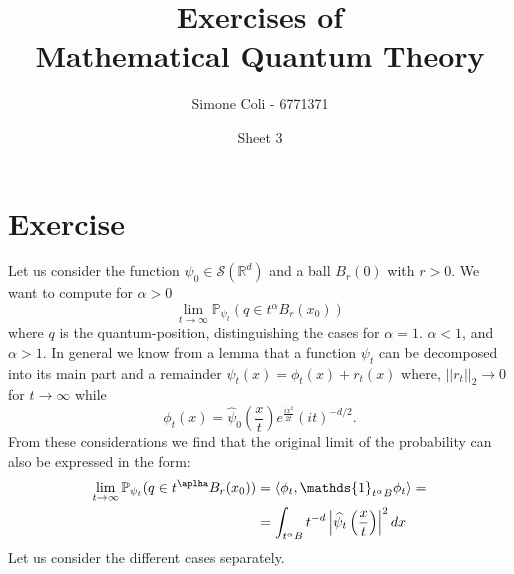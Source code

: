\documentclass{article}
\title{Exercises of \\Mathematical Quantum Theory}
\author{Simone Coli - 6771371}
\date{Sheet 3}
\begin{document}
\maketitle
\section{Exercise}
Let us consider the function $\psi_0 \in \mathcal S (\mathbb R^d)$ and a ball $B_r(0) $ with $r>0$. We want to compute for $\alpha > 0$
\[
    \lim_{t \to \infty} \mathbb P_{\psi_t}(q \in t^{\alpha} B_r(x_0))
\]
where $q$ is the quantum-position, distinguishing the cases for $\alpha = 1$. $\alpha < 1$, and $\alpha > 1$. In general we know from a lemma that a function $\psi_t$ can be decomposed into its main part and a remainder $\psi_t (x) = \phi_t (x) + r_t (x) $ where, $||r_t||_2 \to 0$ for $t\to \infty$ while
\[
    \phi_t (x)= \widehat\psi_0\left(\frac{x}{t}\right) e^{\frac{ix^2}{2t}} (it)^{-d/2}.
\]
From these considerations we find that the original limit of the probability can also be expressed in the form:
\[
    \begin{split}
        \lim_{t \to \infty} \mathbb P_{\psi_t}(q \in t^\aplha B_r(x_0)) & = \langle \phi_t, \mathds{1}_{t^\alpha B} \phi_t \rangle =\\
        & = \int_{t^\alpha B} t^{-d} \left| \widehat \psi_t \left( \frac{x}{t}\right) \right|^2 dx
    \end{split}
\]
Let us consider the different cases separately.
\end{document}
